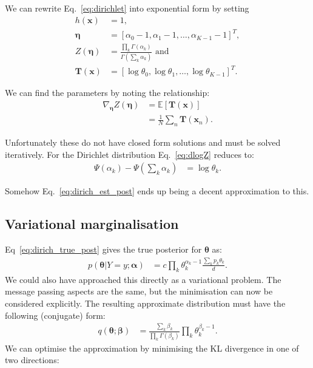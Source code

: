 \documentclass[oneside,english]{scrbook}
\begin{document}
We can rewrite Eq.~\ref{eq:dirichlet} into exponential form by setting
\begin{align}
  h(\bm{x})      &= 1, \\
  \bm{\eta}      &= \left[\alpha_0-1, \alpha_1-1, \hdots, \alpha_{K-1}-1\right]^T, \\
  Z(\bm{\eta})   &= \frac{\prod_k\Gamma(\alpha_k)}{\Gamma(\sum_k \alpha_k)} \text{ and } \\
  \bm{T}(\bm{x}) &= \left[\log \theta_0, \log \theta_1, \hdots, \log \theta_{K-1}\right]^T.
\end{align}

We can find the parameters by noting the relationship:
\begin{align}
  \nabla_{\bm{\eta}} Z(\bm{\eta})
  &= \mathbb{E}\left[\bm{T}(\bm{x})\right] \label{eq:dlogZ} \\
  &= \frac{1}{N}\sum_n\bm{T}(\bm{x}_n) \label{eq:momentmatch}.
\end{align}

Unfortunately these do not have closed form solutions and must be solved iteratively. For the Dirichlet distribution
Eq.~\ref{eq:dlogZ} reduces to:
\begin{align}
  \Psi(\alpha_k) - \Psi(\sum_k\alpha_k) &= \log \theta_k.
\end{align}

Somehow Eq.~\ref{eq:dirich_est_post} ends up being a decent approximation to this.


\subsection{Variational marginalisation}
Eq~\ref{eq:dirich_true_post} gives the true posterior for
$\bm{\theta}$ as:
\begin{align}
  p(\bm{\theta}|Y=y;\bm{\alpha})  &= c\prod_k\theta_k^{\alpha_k-1}\frac{\sum_kp_k\theta_k}{d}.
\end{align}
We could also have approached this directly as a variational
problem. The message passing aspects are the same, but the
minimisation can now be considered explicitly. The resulting
approximate distribution must have the following (conjugate) form:
\begin{align}
  q(\bm{\theta};\bm{\beta})  &= \frac{\sum_k\beta_k}{\prod_k\Gamma(\beta_k)}\prod_{k}\theta_k^{\beta_k-1}.
\end{align}
We can optimise the approximation by minimising the KL divergence in
one of two directions:
\end{document}
